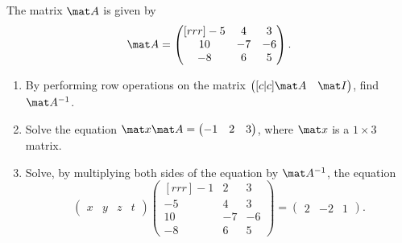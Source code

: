 \begin{problem}
    The matrix $\mat A$ is given by \[\mat A = \begin{pmatrix}[rrr]-5 & 4 & 3 \\ 10 & -7 & -6 \\ -8 & 6 & 5\end{pmatrix}.\]

    \begin{enumerate}
        \item By performing row operations on the matrix $\begin{pmatrix}[c|c] \mat A & \mat I\end{pmatrix}$, find $\mat A^{-1}$.
        \item Solve the equation $\mat x \mat A = \begin{pmatrix}-1 & 2 & 3\end{pmatrix}$, where $\mat x$ is a $1 \times 3$ matrix.
        \item Solve, by multiplying both sides of the equation by $\mat A^{-1}$, the equation \[\begin{pmatrix}x & y & z & t\end{pmatrix} \begin{pmatrix}[rrr]-1 & 2 & 3 \\ -5 & 4 & 3 \\ 10 & -7 & -6 \\ -8 & 6 & 5\end{pmatrix} = \begin{pmatrix}2 & -2 & 1\end{pmatrix}.\]
    \end{enumerate}
\end{problem}
